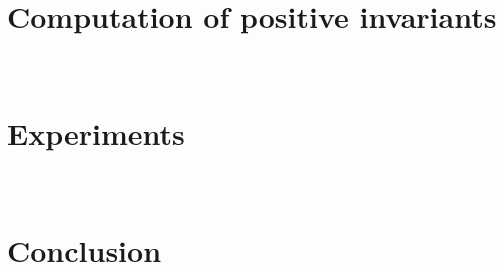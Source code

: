 \documentclass{llncs}
\begin{document}
\section{Computation of positive invariants}~\label{sec:invcomp}


\vspace{-1em}
\section{Experiments}~\label{sec:exp}

\vspace{-0.5em}

\section{Conclusion}~\label{sec:conclusion}


\newpage
%



\end{document}
